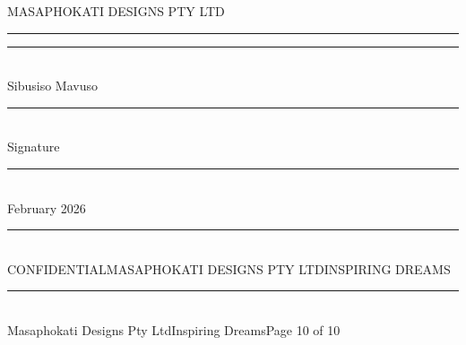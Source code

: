 \documentclass[a4paper,11pt]{article}
\newcommand{\pagefooter}[1]{%
  \vfill
  \noindent\textcolor{grayline}{\rule{\textwidth}{0.4pt}}\\[4pt]
  {\fontsize{7pt}{7pt}\selectfont\latolight\color{textlight}Masaphokati Designs Pty Ltd\;\textbullet\;Inspiring Dreams\hfill Page #1 of 10}
}
\begin{document}
\begin{minipage}[t]{0.46\textwidth}
\begin{tcolorbox}[colback=graybg!40, colframe=grayline, boxrule=0.5pt, arc=3pt, left=5mm, right=5mm, top=5mm, bottom=5mm]
{\color{hblack}\latosemibold\fontsize{8.5pt}{8.5pt}\selectfont{}MASAPHOKATI DESIGNS PTY LTD}\\[2pt]
\textcolor{holive}{\rule{\linewidth}{1.5pt}}

\vspace{28pt}
\textcolor{grayline}{\rule{\linewidth}{0.5pt}}\\[2pt]
{\color{textlight}\latolight\fontsize{7.5pt}{7.5pt}\selectfont Sibusiso Mavuso}

\vspace{28pt}
\textcolor{grayline}{\rule{\linewidth}{0.5pt}}\\[2pt]
{\color{textlight}\latolight\fontsize{7.5pt}{7.5pt}\selectfont Signature}

\vspace{28pt}
\textcolor{grayline}{\rule{\linewidth}{0.5pt}}\\[2pt]
{\color{textlight}\latolight\fontsize{7.5pt}{7.5pt} February 2026}
\end{tcolorbox}
\end{minipage}

\vspace{30pt}
\begin{center}
\textcolor{grayline}{\rule{0.8\textwidth}{0.4pt}}\\[8pt]
{\color{textlight}\latolight\fontsize{7pt}{7pt}\selectfont{}CONFIDENTIAL\;\textbullet\;MASAPHOKATI DESIGNS PTY LTD\;\textbullet\;INSPIRING DREAMS}
\end{center}

\pagefooter{10}
\end{document}
